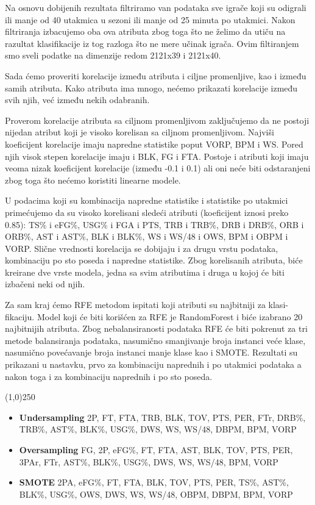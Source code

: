 \documentclass[a4paper]{article}
\begin{document}
Na osnovu dobijenih rezultata filtriramo van podataka sve igrače koji su
odigrali ili manje od 40 utakmica u sezoni ili manje od 25 minuta po utakmici.
Nakon filtriranja izbacujemo oba ova atributa zbog toga što ne želimo da utiču
na razultat klasifikacije iz tog razloga što ne mere učinak igrača. Ovim filtiranjem
smo sveli podatke na dimenzije redom 2121x39 i 2121x40.

Sada ćemo proveriti korelacije između atributa i ciljne promenljive, kao i
između samih atributa. Kako atributa ima mnogo, nećemo prikazati korelacije
između svih njih, već između nekih odabranih.

Proverom korelacije atributa sa ciljnom promenljivom zaključujemo da ne
postoji nijedan atribut koji je visoko korelisan sa ciljnom promenljivom. Najviši
koeficijent korelacije imaju napredne statistike poput VORP, BPM i WS. Pored
njih visok stepen korelacije imaju i BLK, FG i FTA. Postoje i atributi koji
imaju veoma nizak koeficijent korelacije (između -0.1 i 0.1) ali oni neće biti
odstaranjeni zbog toga što nećemo koristiti linearne modele.

U podacima koji su kombinacija napredne statistike i statistike po utakmici
primećujemo da su visoko korelisani sledeći atributi (koeficijent iznosi preko 0.85): TS\% i eFG\%, USG\% i FGA i PTS, TRB i TRB\%, DRB i DRB\%, ORB i ORB\%, AST i AST\%, BLK i BLK\%, WS i WS/48 i OWS, BPM i OBPM i VORP. Slične vrednosti korelacija se dobijaju i za drugu vrstu podataka, kombinaciju po sto poseda i napredne
statistike. Zbog korelisanih atributa, biće kreirane dve vrste modela, jedna sa svim atributima i druga u kojoj će biti izbačeni neki od njih.

Za sam kraj ćemo RFE metodom ispitati koji atributi su najbitniji za klasi-
fikaciju. Model koji će biti korišćen za RFE je RandomForest i biće izabrano 20
najbitnijih atributa. Zbog nebalansiranosti podataka RFE će biti pokrenut za tri metode balansiranja podataka, nasumično smanjivanje broja instanci veće klase, nasumično povećavanje broja instanci manje klase kao i SMOTE. Rezultati su prikazani u nastavku, prvo za kombinaciju naprednih i po utakmici podataka a nakon toga i za kombinaciju naprednih i po sto poseda.

\begin{center}
\line(1,0){250}
\end{center}

\begin{itemize}
	\item \textbf{Undersampling} 2P, FT, FTA, TRB, BLK, TOV, PTS, PER, FTr,
DRB\%, TRB\%, AST\%, BLK\%, USG\%, DWS, WS, WS/48, DBPM, BPM,
VORP
	\item \textbf{Oversampling} FG, 2P, eFG\%, FT, FTA, AST, BLK, TOV, PTS, PER,
3PAr, FTr, AST\%, BLK\%, USG\%, DWS, WS, WS/48, BPM, VORP
	\item \textbf{SMOTE} 2PA, eFG\%, FT, FTA, BLK, TOV, PTS, PER, TS\%, AST\%,
BLK\%, USG\%, OWS, DWS, WS, WS/48, OBPM, DBPM, BPM, VORP
\end{itemize}
\end{document}
